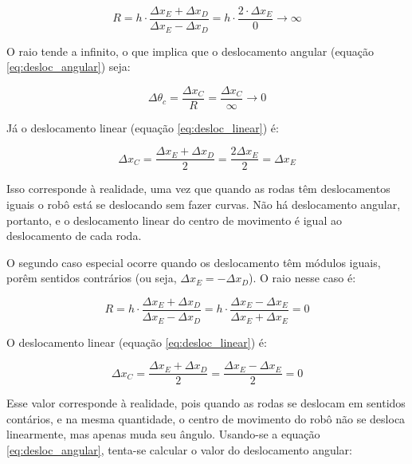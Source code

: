 \begin{equation}
  R = h \cdot \frac{\Delta x_E + \Delta x_D} {\Delta x_E - \Delta x_D} = h \cdot \frac{2 \cdot \Delta x_E}{0} \rightarrow \infty
  \label{eq:caso_especial1_R}
\end{equation}


O raio tende a infinito, o que implica que o deslocamento angular (equação \ref{eq:desloc_angular}) seja:

\begin{equation}
  \Delta \theta_c = \frac{\Delta x_C}{R} = \frac{\Delta x_C}{\infty} \rightarrow 0
  \label{eq:caso_especial1_theta}
\end{equation}

Já o deslocamento linear (equação \ref{eq:desloc_linear}) é:

\begin{equation}
  \Delta x_C = \frac{\Delta x_E + \Delta x_D}{2} = \frac{2 \Delta x_E}{2} = \Delta x_E
  \label{eq:caso_especial1_x}
\end{equation}

Isso corresponde à realidade, uma vez que quando as rodas têm deslocamentos iguais o robô está se deslocando sem fazer curvas. Não há deslocamento angular, portanto, e o deslocamento linear do centro de movimento é igual ao deslocamento de cada roda.

O segundo caso especial ocorre quando os deslocamento têm módulos iguais, porêm sentidos contrários (ou seja, $\Delta x_E = - \Delta x_D$). O raio nesse caso é:

\begin{equation}
  R = h \cdot \frac{\Delta x_E + \Delta x_D} {\Delta x_E - \Delta x_D} = h \cdot \frac{\Delta x_E - \Delta x_E}{\Delta x_E + \Delta x_E} = 0
    \label{eq:caso_especial2_R}
\end{equation}


O deslocamento linear (equação \ref{eq:desloc_linear}) é:

\begin{equation}
  \Delta x_C = \frac{\Delta x_E + \Delta x_D}{2} = \frac{\Delta x_E - \Delta x_E}{2} = 0
  \label{eq:caso_especial2_x}
\end{equation}

Esse valor corresponde à realidade, pois quando as rodas se deslocam em sentidos contários, e na mesma quantidade, o centro de movimento do robô não se desloca linearmente, mas apenas muda seu ângulo.
Usando-se a equação \ref{eq:desloc_angular}, tenta-se calcular o valor do deslocamento angular:

